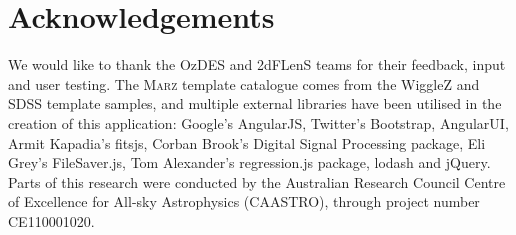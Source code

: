 \documentclass[iop]{emulateapj}
\newcommand{\marz}{\textsc{Marz}}
\begin{document}
\section*{Acknowledgements}
We would like to thank the OzDES and 2dFLenS teams for their feedback, input and user testing. The \marz{} template catalogue comes from the WiggleZ and SDSS template samples, and multiple external libraries have been utilised in the creation of this application: Google's AngularJS, Twitter's Bootstrap, AngularUI, Armit Kapadia's fitsjs, Corban Brook's Digital Signal Processing package, Eli Grey's FileSaver.js, Tom Alexander's regression.js package, lodash and jQuery. Parts of this research were conducted by the Australian Research Council Centre of Excellence for All-sky Astrophysics (CAASTRO), through project number CE110001020.



\end{document}

